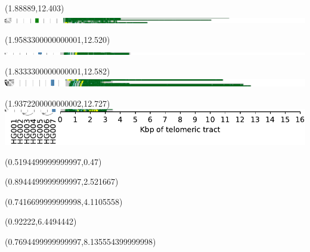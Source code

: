 \documentclass{article}
\begin{document}
\begin{textblock}{13}(1.88889,12.403)\includegraphics{./Figure_S5/18qtel_1-500K_1_12_12_rc-HG004.pdf}\end{textblock}
\begin{textblock}{13}(1.9583300000000001,12.520)\includegraphics{./Figure_S5/18qtel_1-500K_1_12_12_rc-HG005.pdf}\end{textblock}
\begin{textblock}{13}(1.8333300000000001,12.582)\includegraphics{./Figure_S5/18qtel_1-500K_1_12_12_rc-HG006.pdf}\end{textblock}
\begin{textblock}{13}(1.9372200000000002,12.727)\includegraphics{./Figure_S5/18qtel_1-500K_1_12_12_rc-HG007.pdf}\end{textblock}
\begin{textblock}{13}(0.5194499999999997,0.47)\end{textblock}
\begin{textblock}{13}(0.8944499999999997,2.521667)\end{textblock}
\begin{textblock}{13}(0.7416699999999998,4.1105558)\end{textblock}
\begin{textblock}{13}(0.92222,6.4494442)\end{textblock}
\begin{textblock}{13}(0.7694499999999997,8.135554399999998)\end{textblock}
\end{document}
